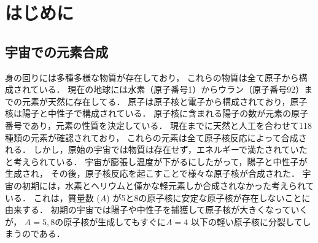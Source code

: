 \documentclass[../master]{subfiles}
\begin{document}
\chapter{はじめに}
\section{宇宙での元素合成}
\label{seq::nucleaosynthesis}
身の回りには多種多様な物質が存在しており，
これらの物質は全て原子から構成されている．
現在の地球には水素（原子番号1）からウラン（原子番号92）までの元素が天然に存在してる．
原子は原子核と電子から構成されており，原子核は陽子と中性子で構成されている．
原子核に含まれる陽子の数が元素の原子番号であり，元素の性質を決定している．
現在までに天然と人工を合わせて118種類の元素が確認されており，
これらの元素は全て原子核反応によって合成される．
しかし，原始の宇宙では物質は存在せず，エネルギーで満たされていたと考えられている．
宇宙が膨張し温度が下がるにしたがって，陽子と中性子が生成され，
その後，原子核反応を起こすことで様々な原子核が合成された．
宇宙の初期には，水素とヘリウムと僅かな軽元素しか合成されなかった考えられている．
これは，質量数 ($A$) が5と8の原子核に安定な原子核が存在しないことに由来する．
初期の宇宙では陽子や中性子を捕獲して原子核が大きくなっていくが，
$A = 5, 8$の原子核が生成してもすぐに$A = 4$ 以下の軽い原子核に分裂してしまうのである．
\end{document}
